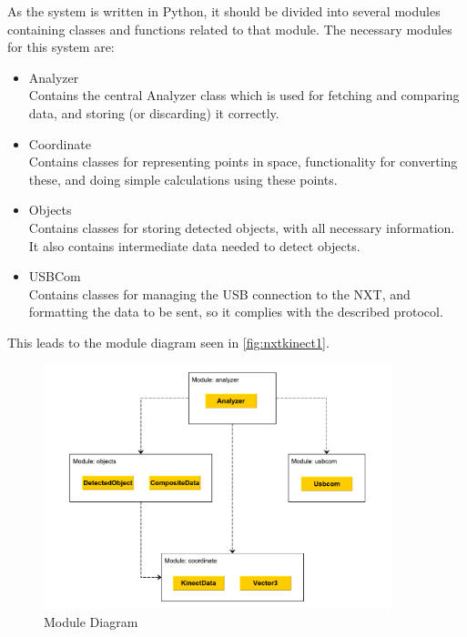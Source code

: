 As the system is written in Python, it should be divided into several modules containing classes
and functions related to that module. The necessary modules for this system are:
\begin{itemize}
  \item{Analyzer}\\
  Contains the central Analyzer class which is used for fetching and comparing data, and storing (or discarding) it
  correctly.
  \item{Coordinate}\\
  Contains classes for representing points in space, functionality for converting these, and doing simple calculations
  using these points.
  \item{Objects}\\
  Contains classes for storing detected objects, with all necessary information. It also contains intermediate data needed to
  detect objects.
  \item{USBCom} \\
  Contains classes for managing the USB connection to the NXT, and formatting the data to be sent, so it complies with
  the described protocol.
\end{itemize}

This leads to the module diagram seen in \autoref{fig:nxtkinect1}.

\begin{figure}[hbtp]
\includegraphics[width=0.90\textwidth]{img/nxtkinect1.pdf}
\caption{Module Diagram} 
\label{fig:nxtkinect1} 
\end{figure}

